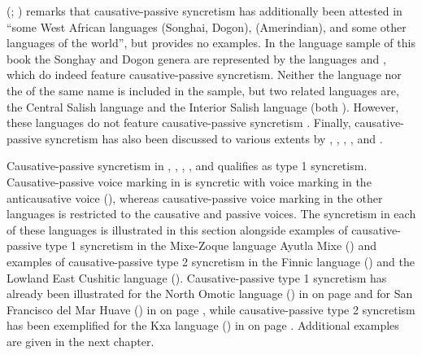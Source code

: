 \citeauthor{kulikov:2001} (\citeyear[894]{kulikov:2001}; \citeyear[394]{kulikov:2010}) remarks that causative-passive syncretism has additionally been attested in “some West African languages (Songhai, Dogon),  (Amerindian), and some other languages of the world”, but provides no examples. In the language sample of this book the Songhay and Dogon genera are represented by the languages  and , which do indeed feature causative-passive syncretism. Neither the language  nor the  of the same name is included in the sample, but two related languages are, the Central Salish language  and the Interior Salish language  (both ). However, these languages do not feature causative-passive syncretism \citep{suttles:2004, willett:2003}. Finally, causative-passive syncretism has also been discussed to various extents by \cite[840]{shibatani:1985}, \cite[46ff.]{haspelmath:1990}, \cite{knott:1995}, \cite[31]{dixon:2000}, and \cite[400ff.]{malchukov:2016}.

Causative-passive syncretism in , , , , and  qualifies as type 1 syncretism. Causative-passive voice marking in  is syncretic with voice marking in the anticausative voice (), whereas causative-passive voice marking in the other languages is restricted to the causative and passive voices. The syncretism in each of these languages is illustrated in this section alongside examples of causative-passive type 1 syncretism in the Mixe-Zoque language Ayutla Mixe () and examples of causative-passive type 2 syncretism in the Finnic language  () and the Lowland East Cushitic language  (). Causative-passive type 1 syncretism has already been illustrated for the North Omotic language  () in  on page \pageref{tab:ch3:type1b-examples-1} and for San Francisco del Mar Huave () in  on page \pageref{tab:ch3:type1b-examples-2}, while causative-passive type 2 syncretism has been exemplified for the Kxa language  () in  on page \pageref{tab:ch3:type2-examples}. Additional examples are given in the next chapter. 

